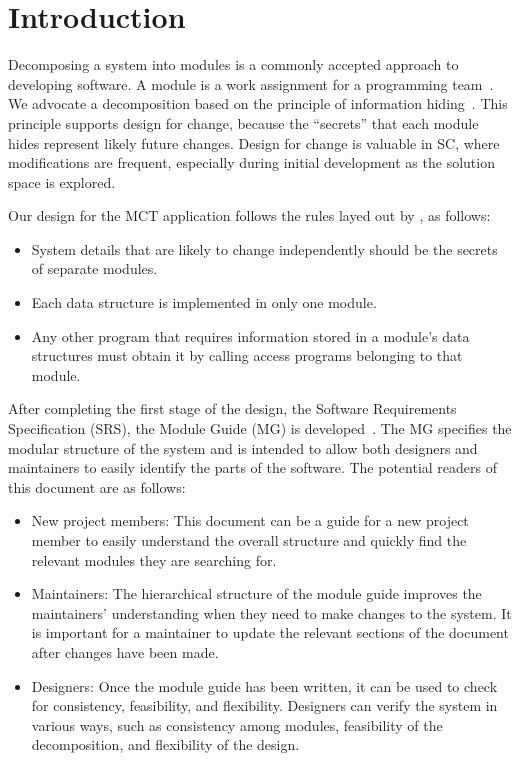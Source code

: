 \documentclass[12pt, titlepage]{article}
\begin{document}
\newpage

\tableofcontents

\listoftables

\listoffigures

\newpage


\section{Introduction}

Decomposing a system into modules is a commonly accepted approach to developing
software.  A module is a work assignment for a programming
team~\citep{ParnasEtAl1984}.  We advocate a decomposition
based on the principle of information hiding~\citep{Parnas1972a}.  This
principle supports design for change, because the ``secrets'' that each module
hides represent likely future changes.  Design for change is valuable in SC,
where modifications are frequent, especially during initial development as the
solution space is explored.  

Our design for the MCT application follows the rules layed out by \citet{ParnasEtAl1984}, as follows:
\begin{itemize}
\item System details that are likely to change independently should be the
  secrets of separate modules.
\item Each data structure is implemented in only one module.
\item Any other program that requires information stored in a module's data
  structures must obtain it by calling access programs belonging to that module.
\end{itemize}

After completing the first stage of the design, the Software Requirements
Specification (SRS), the Module Guide (MG) is developed~\citep{ParnasEtAl1984}. The MG
specifies the modular structure of the system and is intended to allow both
designers and maintainers to easily identify the parts of the software.  The
potential readers of this document are as follows:

\begin{itemize}
\item New project members: This document can be a guide for a new project member
  to easily understand the overall structure and quickly find the
  relevant modules they are searching for.
\item Maintainers: The hierarchical structure of the module guide improves the
  maintainers' understanding when they need to make changes to the system. It is
  important for a maintainer to update the relevant sections of the document
  after changes have been made.
\item Designers: Once the module guide has been written, it can be used to
  check for consistency, feasibility, and flexibility. Designers can verify the
  system in various ways, such as consistency among modules, feasibility of the
  decomposition, and flexibility of the design.
\end{itemize}
\end{document}
